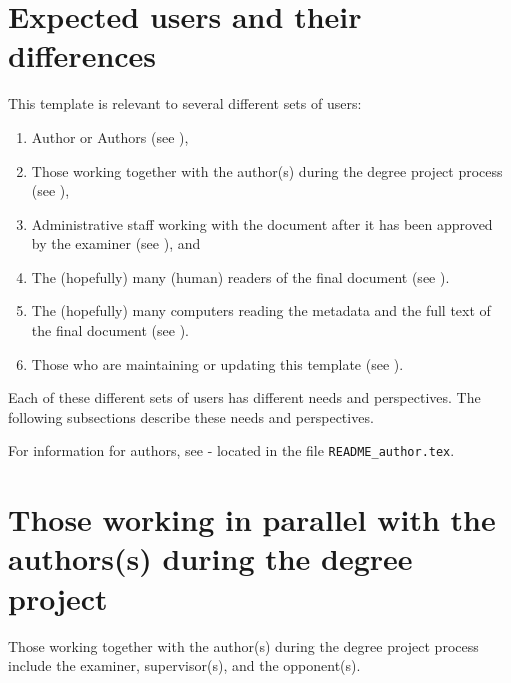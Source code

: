 \section{Expected users and their differences}
\label{sec:expectedUsers}
This template is relevant to several different sets of users:
\begin{enumerate}[leftmargin=*,label=\textbf{Users \arabic*}, ref={Users \arabic*}]
    \item \label{users:authors} Author or Authors (see ),
    \item \label{users:others} Those working together with the author(s) during the degree project process (see ),
    \item \label{users:admins} Administrative staff working with the document after it has been approved by the examiner (see ), and
    \item \label{users:readers} The (hopefully) many (human) readers of the final document (see ).
    \item \label{users:searchEngines} The (hopefully) many computers reading the metadata and the full text of the final document (see ).
    \item \label{users:maintainer} Those who are maintaining or updating this template (see ).
\end{enumerate}

Each of these different sets of users has different needs and perspectives. The following subsections describe these needs and perspectives.

For information for authors, see  - located in the file \texttt{README\_author.tex}.

\section[Those working in parallel with the authors(s) during the degree project]{Those working in parallel with the\\authors(s) during the degree project}
\label{sec:examinerAdvisorsOpponent}
Those working together with the author(s) during the degree project process include the examiner, supervisor(s), and the opponent(s).

